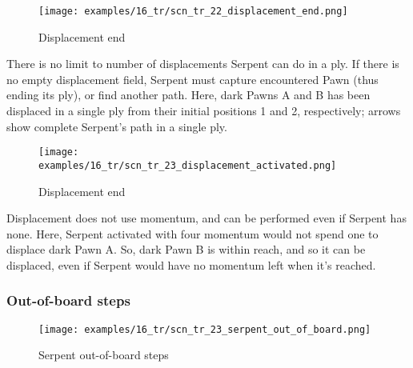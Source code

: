 \vspace*{5.1\baselineskip}

\noindent
\begin{wrapfigure}[11]{l}{0.4\textwidth}
\centering
\texttt{[image: examples/16\_tr/scn\_tr\_22\_displacement\_end.png]}
\vspace*{-0.5\baselineskip}
\caption{Displacement end}
\label{fig:scn_tr_22_displacement_end}
\end{wrapfigure}
\indent
There is no limit to number of displacements Serpent can do in a ply. If there is no
empty displacement field, Serpent must capture encountered Pawn (thus ending its ply),
or find another path. \newline
\indent
Here, dark Pawns A and B has been displaced in a single ply from their initial positions
1 and 2, respectively; arrows show complete Serpent's path in a single ply.

\noindent
\begin{wrapfigure}[11]{l}{0.4\textwidth}
\centering
\texttt{[image: examples/16\_tr/scn\_tr\_23\_displacement\_activated.png]}
\vspace*{-0.5\baselineskip}
\caption{Displacement end}
\label{fig:scn_tr_23_displacement_activated}
\end{wrapfigure}
Displacement does not use momentum, and can be performed even if Serpent has none. \newline
\indent
Here, Serpent activated with four momentum would not spend one to displace dark
Pawn A. So, dark Pawn B is within reach, and so it can be displaced, even if
Serpent would have no momentum left when it's reached.

\clearpage %

\subsubsection*{Out-of-board steps}
\label{sec:Tamoanchan Revisited/Serpent/Movement/Out-of-board steps}

\vspace*{-1.0\baselineskip}
\noindent
\begin{figure}[!h]
\texttt{[image: examples/16\_tr/scn\_tr\_23\_serpent\_out\_of\_board.png]}
\caption{Serpent out-of-board steps}
\label{fig:scn_tr_23_serpent_out_of_board}
\end{figure}

